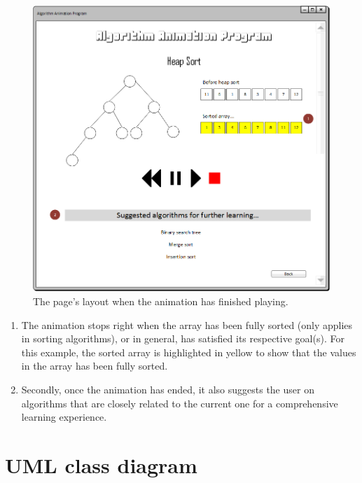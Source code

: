 \newpage

\begin{figure}[H]
\centering
\hspace*{-0.5cm}
\includegraphics[scale=0.8]{images/report_images/uiAnimationDone.png}
\caption{The page's layout when the animation has finished playing.}
\label{uiAnimationDone}
\end{figure}

\begin{enumerate}
\item The animation stops right when the array has been fully sorted (only applies in sorting algorithms), or in general, has satisfied its respective goal(s). For this example, the sorted array is highlighted in yellow to show that the values in the array has been fully sorted.
\item Secondly, once the animation has ended, it also suggests the user on algorithms that are closely related to the current one for a comprehensive learning experience.
\end{enumerate}


\section{UML class diagram}

